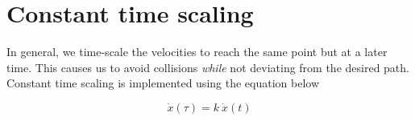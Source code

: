 
\section{Constant time scaling}

In general, we time-scale the velocities to reach the same point but at a later time. This causes us to avoid collisions \emph{while} not deviating from the desired path. Constant time scaling is implemented using the equation below

\begin{equation}
    \dot{x} (\tau) = k \: \dot{x}(t)
\end{equation}




